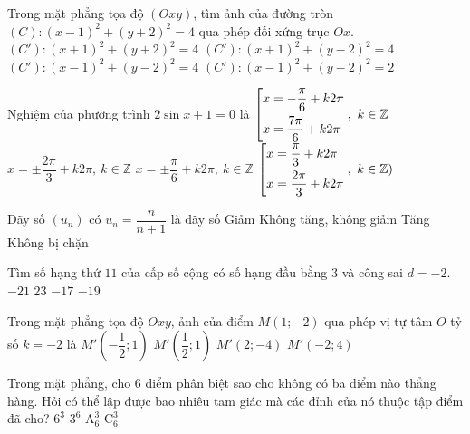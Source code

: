 \begin{ex}%
Trong mặt phẳng tọa độ $(Oxy)$, tìm ảnh của đường tròn $(C) : (x-1)^2 +(y+2)^2 =4$ qua phép đối xứng trục $Ox$. 
\choice
{$(C') : (x+1)^2 +(y+2)^2 =4$}
{$(C') : (x+1)^2 +(y-2)^2 =4$}
{\True $(C') : (x-1)^2 +(y-2)^2 =4$}
{$(C') : (x-1)^2 +(y-2)^2 =2$}
\end{ex}


\begin{ex}%
Nghiệm của phương trình $2\sin x + 1 =0 $ là
\choice
{\True $\left[\begin{aligned}&x=-\dfrac{\pi}{6} + k 2\pi\\&x=\dfrac{7\pi}{6} + k 2\pi\end{aligned}\right.,~ k \in \mathbb{Z}$}
{$x=\pm \dfrac{2\pi}{3} + k 2\pi, ~ k \in \mathbb{Z} $}
{$x=\pm \dfrac{\pi}{6} + k 2\pi, ~ k \in \mathbb{Z} $}
{$\left[\begin{aligned}&x=\dfrac{\pi}{3} + k 2\pi\\&x=\dfrac{2\pi}{3} + k 2\pi\end{aligned}\right.,~ k \in \mathbb{Z})$}
\end{ex}

\begin{ex}%
Dãy số $(u_n)$ có $u_n = \dfrac{n}{n+1}$ là dãy số 
\choice
{Giảm}
{Không tăng, không giảm}
{\True Tăng}
{Không bị chặn}
\end{ex}

\begin{ex}%
Tìm số hạng thứ $11$ của cấp số cộng có số hạng đầu bằng $3$ và công sai $d=-2$.
\choice
{$-21$}
{$23$}
{\True $-17$}
{$-19$}
\end{ex}

\begin{ex}%
Trong mặt phẳng tọa độ $Oxy$, ảnh của điểm $M(1;-2)$ qua phép vị tự tâm $O$ tỷ số $k=-2$ là
\choice
{$M'\left (-\dfrac{1}{2};1\right )$}
{$M'\left (\dfrac{1}{2};1\right )$}
{$M'\left (2;-4\right )$}
{$M'\left (-2;4\right )$}
\end{ex}

\begin{ex}%
Trong mặt phẳng, cho $6$ điểm phân biệt sao cho không có ba điểm nào thẳng hàng. Hỏi có thể lập được bao nhiêu tam giác mà các đỉnh của nó thuộc tập điểm đã cho?
\choice
{$6^3$}
{$3^6$}
{$\mathrm{A_6^3}$}
{$\mathrm{C_6^3}$}
\end{ex}


